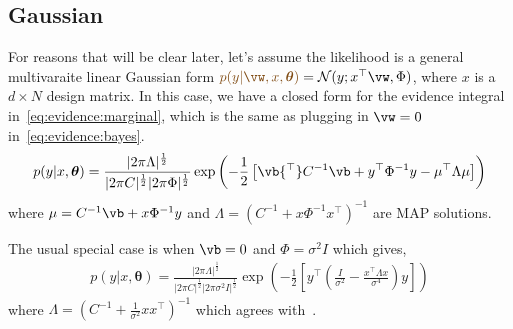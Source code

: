 \documentclass{article}
\newcounter{ct}
\newcommand{\inv}{^{-1}}
\newcommand{\trp}{{^\top}} %
\newcommand{\Gaussian}{\ensuremath{\mathcal{N}}} %
\newcommand{\weight}{\vw}
\newcommand{\hyp}{\bm{\theta}}
\newcommand{\likelihood}{\ensuremath{\textcolor{goldenbrown}{p(y|\weight,x,\hyp)}}}
\begin{document}
\subsection{Gaussian}
For reasons that will be clear later, let's assume the likelihood is a general multivaraite linear Gaussian form $\likelihood = \Gaussian(y; x\trp \weight, \Phi)$, where $x$ is a $d \times N$ design matrix.
In this case, we have a closed form for the evidence integral in~\eqref{eq:evidence:marginal}, which is the same as plugging in $\weight = 0$ in~\eqref{eq:evidence:bayes}.
\begin{align}
p(y|x,\hyp) =
    \frac{|2\pi\Lambda|^{\frac{1}{2}}}
    {|2\pi C|^{\frac{1}{2}} |2\pi \Phi|^{\frac{1}{2}}}
    \exp\left(
	-\frac{1}{2}
	\left[
	    \vb\trp C\inv \vb + y\trp\Phi\inv y
	    - \mu\trp \Lambda \mu
	\right]
    \right)
\end{align}
where 
$\mu = C\inv \vb + x\Phi\inv y$ and
$\Lambda = \left( C\inv + x\Phi\inv x\trp \right)\inv$ are MAP solutions.

The usual special case is when $\vb = 0$ and $\Phi = \sigma^2 I$ which gives,
\begin{align}
    p(y|x,\hyp) =
    \frac{|2\pi\Lambda|^{\frac{1}{2}}}
    {|2\pi C|^{\frac{1}{2}} |2\pi \sigma^2 I|^{\frac{1}{2}}}
    \exp\left(
	-\frac{1}{2}
	\left[
	    y\trp 
	    \left(
		\frac{I}{\sigma^2}
		-
		\frac{
		    x\trp 
		    \Lambda
		    x
		}{\sigma^4}
	    \right)
	    y
	\right]
    \right)
\end{align}
where $\Lambda = \left( C\inv + \frac{1}{\sigma^2}x x\trp \right)\inv$ which agrees with~\cite{Sahani2002}.




\end{document}
